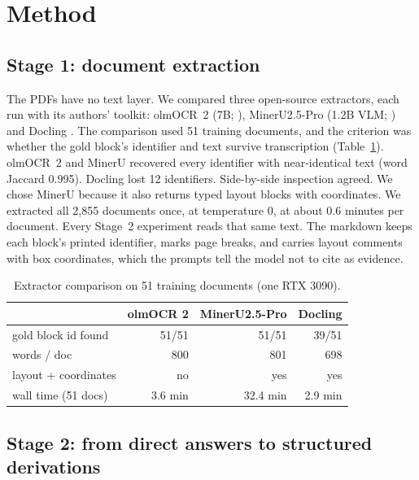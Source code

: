 \documentclass[11pt]{article}%
\begin{document}
\section{Method}
\label{sec:method}

\subsection{Stage 1: document extraction}
\label{sec:extraction}

The PDFs have no text layer. We compared three open-source extractors, each
run with its authors' toolkit: olmOCR~2 (7B; \citealp{poznanski2025olmocr2}),
MinerU2.5-Pro (1.2B VLM; \citealp{niu2025mineru25}) and Docling
\citep{auer2024docling}. The comparison used 51 training documents, and the
criterion was whether the gold block's identifier and text survive transcription
(Table~\ref{tab:extraction}). olmOCR~2 and MinerU recovered every identifier
with near-identical text (word Jaccard 0.995). Docling lost 12 identifiers.
Side-by-side inspection agreed. We chose MinerU because it also returns typed
layout blocks with coordinates. We extracted all 2{,}855 documents once, at
temperature 0, at about 0.6 minutes per document. Every Stage~2 experiment
reads that same text. The markdown keeps each block's printed identifier,
marks page breaks, and carries layout comments with box coordinates, which the
prompts tell the model not to cite as evidence.

\begin{table}[h]
\centering
\small
\setlength{\tabcolsep}{4pt}
\begin{tabularx}{\columnwidth}{>{\raggedright\arraybackslash}Xrrr}
\toprule
& olmOCR 2 & MinerU2.5-Pro & Docling \\
\midrule
gold block id found  & 51/51 & 51/51 & 39/51 \\
words / doc          & 800 & 801 & 698 \\
layout + coordinates & no  & yes & yes \\
wall time (51 docs)  & 3.6 min & 32.4 min & 2.9 min \\
\bottomrule
\end{tabularx}
\caption{Extractor comparison on 51 training documents (one RTX 3090).}
\label{tab:extraction}
\end{table}

\subsection{Stage 2: from direct answers to structured derivations}
\label{sec:ladder}
\end{document}
